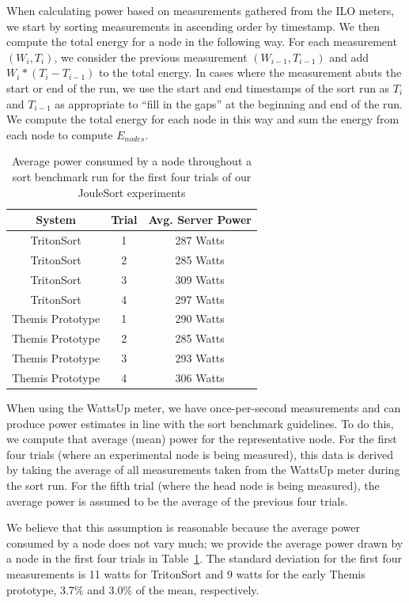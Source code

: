 When calculating power based on measurements gathered from the ILO meters, we
start by sorting measurements in ascending order by timestamp. We then compute
the total energy for a node in the following way. For each measurement $(W_i,
T_i)$, we consider the previous measurement $(W_{i-1}, T_{i-1})$ and add $W_i *
(T_i - T_{i-1})$ to the total energy. In cases where the measurement abuts the
start or end of the run, we use the start and end timestamps of the sort run as
$T_i$ and $T_{i - 1}$ as appropriate to ``fill in the gaps'' at the beginning
and end of the run. We compute the total energy for each node in this way and
sum the energy from each node to compute $E_{nodes}$.

\begin{table}
\centering
\caption{\label{table:power_draw} Average power consumed by a node throughout
a sort benchmark run for the first four trials of our JouleSort experiments}
\begin{tabular}{|cc|c|}
\hline
\textbf{System} & \textbf{Trial} & \textbf{Avg. Server Power} \\
\hline
TritonSort & 1 & 287 Watts \\
TritonSort & 2 & 285 Watts \\
TritonSort & 3 & 309 Watts \\
TritonSort & 4 & 297 Watts \\
Themis Prototype & 1 & 290 Watts \\
Themis Prototype & 2 & 285 Watts \\
Themis Prototype & 3 & 293 Watts \\
Themis Prototype & 4 & 306 Watts \\
\hline
\end{tabular}
\end{table}

When using the WattsUp meter, we have once-per-second measurements and can
produce power estimates in line with the sort benchmark guidelines. To do this,
we compute that average (mean) power for the representative node. For the first
four trials (where an experimental node is being measured), this data is
derived by taking the average of all measurements taken from the WattsUp meter
during the sort run. For the fifth trial (where the head node is being
measured), the average power is assumed to be the average of the previous four
trials.

We believe that this assumption is reasonable because the average power
consumed by a node does not vary much; we provide the average power drawn by a
node in the first four trials in Table~\ref{table:power_draw}. The standard
deviation for the first four measurements is 11 watts for TritonSort and 9 watts
for the early Themis prototype, 3.7\% and 3.0\% of the mean, respectively.

